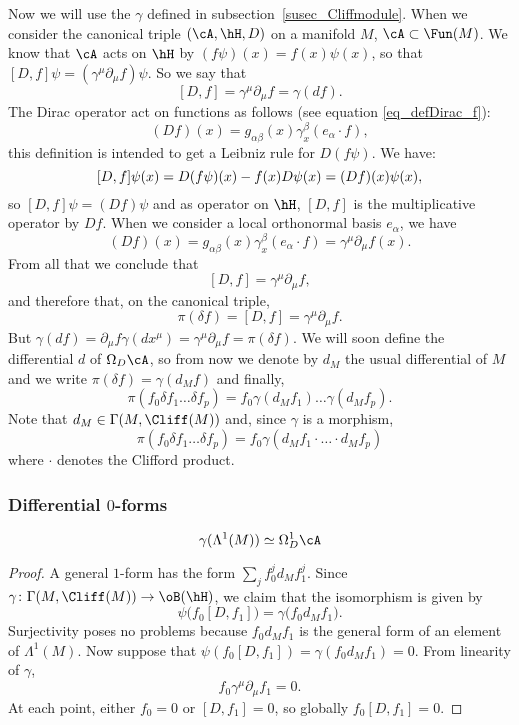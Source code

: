 Now we will use the $\gamma$ defined in subsection~\ref{susec_Cliffmodule}. When we consider the canonical triple $(\cA,\hH,D)$ on a manifold $M$, $\cA\subset\Fun(M)$. We know that $\cA$ acts on $\hH$ by $(f\psi)(x)=f(x)\psi(x)$, so that $[D,f]\psi=(\gamma^{\mu}\partial_{\mu}f)\psi$. So we say that
\[
	[D,f]=\gamma^{\mu}\partial_{\mu}f=\gamma(df).
\]
The Dirac operator act on functions as follows (see equation \eqref{eq_defDirac_f}):
\[
	(Df)(x)=g_{\alpha\beta}(x)\gamma^{\beta}_x(e_{\alpha}\cdot f),
\]
this definition is intended to get a Leibniz rule for $D(f\psi)$. We have:
\[
	[D,f]\psi(x)=D(f\psi)(x)-f(x)D\psi(x)\\
	=(Df)(x)\psi(x),
\]
so $[D,f]\psi=(Df)\psi$ and as operator on $\hH$, $[D,f]$ is the multiplicative operator by $Df$. When we consider a local orthonormal basis $e_{\alpha}$, we have
\[
	(Df)(x)=g_{\alpha\beta}(x)\gamma_x^{\beta}(e_{\alpha}\cdot f)
	=\gamma^{\mu}\partial_{\mu}f(x).
\]
From all that we conclude that
\[
	[D,f]=\gamma^{\mu}\partial_{\mu}f,
\]
and therefore that, on the canonical triple,
\begin{equation}
	\pi(\delta f)=[D,f]=\gamma^{\mu}\partial_{\mu}f.
\end{equation}
But $\gamma(df)=\partial_{\mu}f\gamma(dx^{\mu})=\gamma^{\mu}\partial_{\mu}f=\pi(\delta f)$. We will soon define the differential $d$ of $\Omega_D\cA$, so from now we denote by $d_M$ the usual differential of $M$ and we write $\pi(\delta f)=\gamma(d_Mf)$ and finally,
\begin{equation}
	\pi(f_0\delta f_1\ldots \delta f_p)=f_0\gamma(d_Mf_1)\ldots\gamma(d_Mf_p).
\end{equation}
Note that $d_M\in\Gamma(M,\Cliff(M))$ and, since $\gamma$ is a morphism,
\begin{equation} \label{EqpildotsdeltagamdM}
	\pi(f_0\delta f_1\ldots\delta f_p)=f_0\gamma(d_Mf_1\cdot\ldots\cdot d_Mf_p)
\end{equation}
where $\cdot$ denotes the Clifford product.


\subsubsection{Differential \texorpdfstring{$0$}{0}-forms}

\begin{lemma}
	\[
		\gamma(\Lambda^1(M))\simeq\Omega^1_D\cA
	\]
\end{lemma}

\begin{proof}

	A general $1$-form has the form $\sum_j f_0^jd_Mf_1^j$. Since $\gamma\colon \Gamma(M,\Cliff(M))\to \oB(\hH)$, we claim that the isomorphism is given by
	\[
		\psi\big( f_0[D,f_1] \big)=\gamma\big( f_0d_Mf_1 \big).
	\]
	Surjectivity poses no problems because $f_0d_Mf_1$ is the general form of an element of $\Lambda^1(M)$. Now suppose that $\psi(f_0[D,f_1])=\gamma(f_0d_Mf_1)=0$. From linearity of $\gamma$,
	\[
		f_0\gamma^{\mu}\partial_{\mu}f_1=0.
	\]
	At each point, either $f_0=0$ or $[D,f_1]=0$, so globally $f_0[D,f_1]=0$.
\end{proof}

